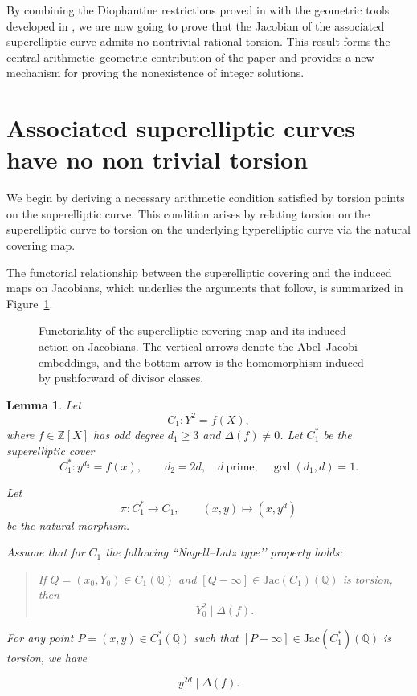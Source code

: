 \documentclass[12pt, reqno]{amsart}
\newtheorem{lemma}[thm]{Lemma}
\numberwithin{equation}{section}
\theoremstyle{definition}
\theoremstyle{nodefstyle}
\newcommand{\Jac}{\operatorname{Jac}}
\begin{document}
By combining the Diophantine restrictions proved in  with the geometric tools
developed in , we are now going to prove that the Jacobian of the associated superelliptic curve
admits no nontrivial rational torsion. This result forms the central
arithmetic--geometric contribution of the paper and provides a new mechanism for proving
the nonexistence of integer solutions.
\section{Associated superelliptic curves have no non trivial torsion}\label{sec:Superelliptic curves}
We begin by deriving a necessary arithmetic condition satisfied by torsion points on the superelliptic curve. This condition arises by relating torsion on the superelliptic curve to torsion on the underlying hyperelliptic curve via the natural covering map.

The functorial relationship between the superelliptic covering and the induced maps on
Jacobians, which underlies the arguments that follow, is summarized in
Figure~\ref{fig:functoriality}.
\begin{figure}[htbp]
\centering
{}
\caption{Functoriality of the superelliptic covering map and its induced action on Jacobians.
The vertical arrows denote the Abel--Jacobi embeddings, and the bottom arrow is the
homomorphism induced by pushforward of divisor classes.}
\label{fig:functoriality}
\end{figure}

\vspace{40mm}

\begin{lemma}\label{lem:1}
Let 
\[
C_1 : Y^2 = f(X),
\]
where \(f\in\mathbb Z[X]\) has odd degree \(d_1\ge 3\) and \(\Delta(f)\neq 0\).
Let \(C_1^*\) be the superelliptic cover 
\[
C_1^*: y^{d_2} = f(x), \qquad d_2 = 2d,\quad d\ \text{prime},\quad \gcd(d_1,d)=1.
\]

Let
\[
\pi : C_1^* \longrightarrow C_1,\qquad (x,y)\mapsto (x,y^d)
\]
be the natural morphism.

Assume that for \(C_1\) the following “Nagell--Lutz type’’ property holds:

\begin{quote}
If \(Q=(x_0,Y_0)\in C_1(\mathbb Q)\) and \([Q-\infty]\in \mathrm{Jac}(C_1)(\mathbb Q)\) is torsion, then  
\[
Y_0^2 \mid \Delta(f).
\]
\end{quote}

For any point \(P=(x,y)\in C_1^*(\mathbb Q)\) such that \([P-\infty]\in \mathrm{Jac}(C_1^*)(\mathbb Q)\) is torsion, we have

$$y^{2d} \mid \Delta(f).$$
\end{lemma}
\end{document}

